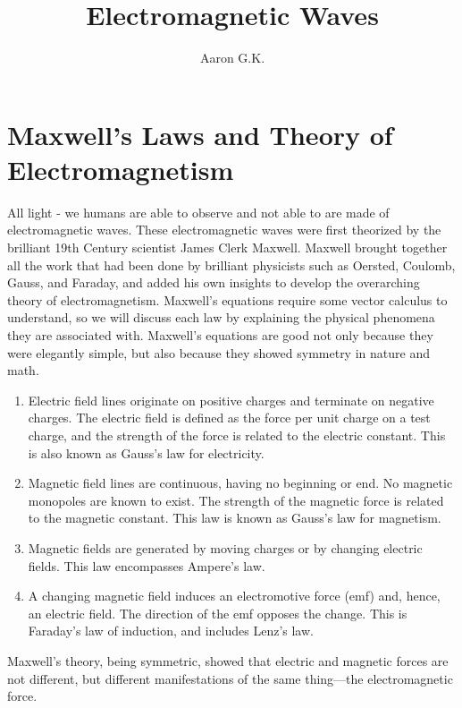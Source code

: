 \documentclass[11pt]{article}
\title{Electromagnetic Waves}
\author{Aaron G.K.}
\begin{document}
	\maketitle
	\section*{Maxwell's Laws and Theory of Electromagnetism}
	All light - we humans are able to observe and not able to are made of electromagnetic waves. These electromagnetic waves were first theorized by the brilliant 19th Century scientist James Clerk Maxwell. Maxwell brought together all the work that had been done by brilliant physicists such as Oersted, Coulomb, Gauss, and Faraday, and added his own insights to develop the overarching theory of electromagnetism. Maxwell’s equations require some vector calculus to understand, so we will discuss each law by explaining the physical phenomena they are associated with. Maxwell's equations are good not only because they were elegantly simple, but also because they showed symmetry in nature and math.
	\begin{enumerate}
		\item Electric field lines originate on positive charges and terminate on negative charges. The electric field is defined as the force per unit charge on a test charge, and the strength of the force is related to the electric constant. This is also known as Gauss’s law for electricity.
		\item Magnetic field lines are continuous, having no beginning or end. No magnetic monopoles are known to exist. The strength of the magnetic force is related to the magnetic constant. This law is known as Gauss’s law for magnetism.
		\item Magnetic fields are generated by moving charges or by changing electric fields. This law encompasses Ampere’s law.
		\item A changing magnetic field induces an electromotive force (emf) and, hence, an electric field. The direction of the emf opposes the change. This is Faraday’s law of induction, and includes Lenz’s law.
	\end{enumerate}
	Maxwell’s theory, being symmetric, showed that electric and magnetic forces are not different, but different manifestations of the same thing—the electromagnetic force.\\ \\
\end{document}
